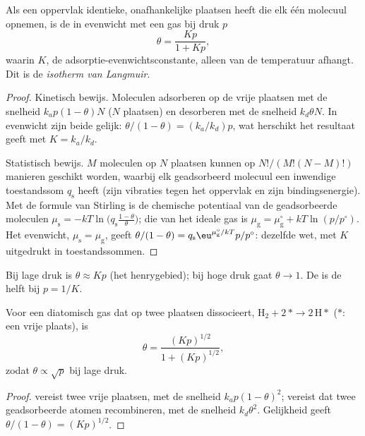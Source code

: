 \begin{theorem}\label{thm:b3:surfaces-catalysis:langmuir}
Als een oppervlak identieke, onafhankelijke plaatsen heeft die elk één
molecuul opnemen, is de  in evenwicht met een gas bij druk
$p$
\[
  \theta = \frac{Kp}{1 + Kp},
\]
waarin $K$, de adsorptie-evenwichtsconstante, alleen van de temperatuur
afhangt. Dit is de \emph{isotherm van Langmuir}.
\end{theorem}

\begin{proof}
Kinetisch bewijs. Moleculen adsorberen op de vrije plaatsen met de snelheid $k_ap(1 - \theta)N$ ($N$
plaatsen) en desorberen met de snelheid $k_d\theta N$. In evenwicht zijn
beide gelijk: $\theta/(1 - \theta)
= (k_a/k_d)p$, wat herschikt het resultaat geeft met $K = k_a/k_d$.

Statistisch bewijs. $M$ moleculen op $N$ plaatsen kunnen op $N!/(M!(N - M)!)$
manieren geschikt worden, waarbij elk geadsorbeerd molecuul een inwendige
toestandssom $q_{\mathrm s}$ heeft (zijn vibraties tegen het oppervlak en
zijn bindingsenergie). Met de formule van Stirling is de chemische
potentiaal van de geadsorbeerde moleculen $\mu_{\mathrm s} = -kT\ln\bigl(q_{\mathrm s}\frac{1 - \theta}{\theta}\bigr)$;
die van het ideale gas is $\mu_{\mathrm g} = \mu_{\mathrm g}^\circ + kT\ln(p/p^\circ)$. Het evenwicht, $\mu_{\mathrm s} = \mu_{\mathrm g}$, geeft
$\theta/(1 - \theta) = q_{\mathrm s}\eu^{\mu_{\mathrm g}^\circ/kT}p/p^\circ$: dezelfde wet, met $K$
uitgedrukt in toestandssommen.
\end{proof}

Bij lage druk is $\theta \approx Kp$ (het henrygebied); bij hoge druk gaat
$\theta \to 1$. De  is de helft bij $p = 1/K$.

\begin{proposition}\label{prop:b3:surfaces-catalysis:dissociative}
Voor een diatomisch gas dat op twee plaatsen dissocieert, $\mathrm{H_2} + 2\,{*} \to 2\,\mathrm{H}{*}$ (${*}$: een vrije plaats), is
\[
  \theta = \frac{(Kp)^{1/2}}{1 + (Kp)^{1/2}},
\]
zodat $\theta \propto \sqrt p$ bij lage druk.
\end{proposition}

\begin{proof}
 vereist twee vrije plaatsen, met de snelheid $k_ap(1 - \theta)^2$;
 vereist dat twee geadsorbeerde atomen recombineren, met de
snelheid $k_d\theta^2$. Gelijkheid geeft $\theta/(1 - \theta) =
(Kp)^{1/2}$.
\end{proof}

